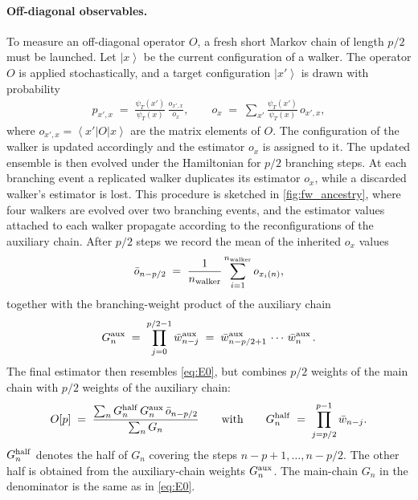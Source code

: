 \documentclass{SciPost}
\newcommand{\nwalker}{n_{\rm walker}}
\providecommand{\ket}[1]{\left|#1\right\rangle}
\providecommand{\bra}[1]{\left\langle#1\right|}
\begin{document}
\paragraph{Off-diagonal observables.}
To measure an off-diagonal operator $O$, a fresh short Markov chain of length $p/2$ must be launched.
%
Let $\ket{x}$ be the current configuration of a walker.
%
The operator $O$ is applied stochastically, and a target configuration $\ket{x'}$ is drawn with probability
\begin{align}
	p_{x',x} \;=\;\frac{\psi_T(x')}{\psi_T(x)}\,\frac{o_{x',x}}{o_x},
	\qquad
	o_x \;=\; \sum_{x'} \frac{\psi_T(x')}{\psi_T(x)}\,o_{x',x},
	\label{eq:prob_operator}
\end{align}
where $o_{x',x} = \bra{x'} O \ket{x}$ are the matrix elements of $O$.
%
The configuration of the walker is updated accordingly and the estimator $o_x$ is assigned to it.
%
The updated ensemble is then evolved under the Hamiltonian for $p/2$ branching steps.
%
At each branching event a replicated walker duplicates its estimator $o_x$, while a discarded walker's estimator is lost.
%
This procedure is sketched in \autoref{fig:fw_ancestry}, where four walkers are evolved over two branching events, and the estimator values attached to each walker propagate according to the reconfigurations of the auxiliary chain.
%
After $p/2$ steps we record the mean of the inherited $o_x$ values
\begin{align}
	\bar{o}_{n-p/2} \;=\; \frac{1}{\nwalker} \sum_{i=1}^{\nwalker} o_{x_i(n)},
	\label{eq:obs_oavg}
\end{align}
together with the branching-weight product of the auxiliary chain
\begin{align}
	G^{\rm aux}_n \;=\; \prod_{j=0}^{p/2-1} \bar w^{\rm aux}_{n-j}
	\;=\; \bar w^{\rm aux}_{n-p/2+1}\,\cdots\,\bar w^{\rm aux}_{n}\,.
	\label{eq:obs_gaux}
\end{align}
The final estimator then resembles \autoref{eq:E0}, but combines $p/2$ weights of the main chain with $p/2$ weights of the auxiliary chain:
\begin{align}
	O[p] \;=\; \frac{\sum_n G^{\rm half}_n \, G^{\rm aux}_n \, \bar{o}_{n-p/2}}{\sum_n G_n}
	\qquad\text{with}\qquad
	G^{\rm half}_n \;=\; \prod_{j=p/2}^{p-1} \bar{w}_{n-j}.
	\label{eq:obs}
\end{align}
$G^{\rm half}_n$ denotes the half of $G_n$ covering the steps $n-p+1,\ldots,n-p/2$.
%
The other half is obtained from the auxiliary-chain weights $G^{\rm aux}_n$.
%
The main-chain $G_n$ in the denominator is the same as in \autoref{eq:E0}.
\end{document}
